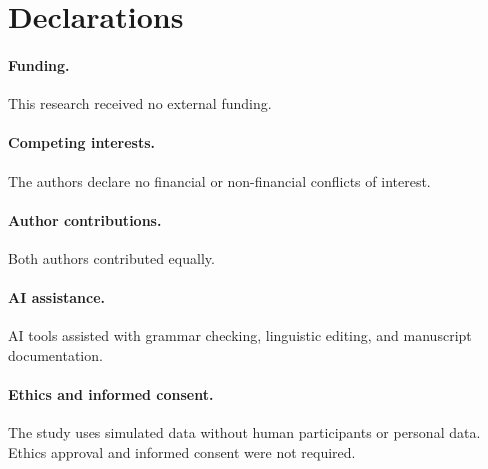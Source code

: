 \section*{Declarations}
\paragraph{Funding.} This research received no external funding.

\paragraph{Competing interests.} The authors declare no financial or non-financial conflicts of interest.

\paragraph{Author contributions.} Both authors contributed equally.

\paragraph{AI assistance.} AI tools assisted with grammar checking, linguistic editing, and manuscript documentation.

\paragraph{Ethics and informed consent.} The study uses simulated data without human participants or personal data. Ethics approval and informed consent were not required.
